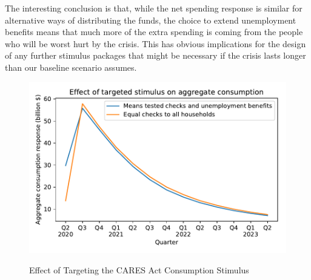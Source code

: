 \documentclass[titlepage]{\econtex}
\begin{document}
The interesting conclusion is that, while the net spending response is similar for alternative ways of distributing the funds, the choice to extend unemployment benefits means that much more of the extra spending is coming from the people who will be worst hurt by the crisis.  This has obvious implications for the design of any further stimulus packages that might be necessary if the crisis lasts longer than our baseline scenario assumes.

\begin{figure}
  \centering
  \caption{Effect of Targeting the CARES Act Consumption Stimulus}
  \label{EffectTargeting}
  { \includegraphics[width=8in]{./Figures/EffectTargeting}}
\end{figure}
\end{document}
